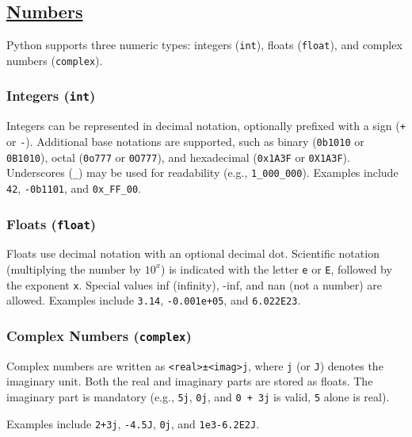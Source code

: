 \subsection*{\href{https://sourceacademy.org/sicpjs/1.1.1\#p3}{Numbers}}

Python supports three numeric types: integers (\texttt{int}), floats (\texttt{float}), and complex numbers (\texttt{complex}).

\subsubsection*{Integers (\texttt{int})}

Integers can be represented in decimal notation, optionally prefixed with a sign (\texttt{+} or \texttt{-}).
Additional base notations are supported, such as binary (\texttt{0b1010} or \texttt{0B1010}), octal (\texttt{0o777} or \texttt{0O777}), and 
hexadecimal (\texttt{0x1A3F} or \texttt{0X1A3F}). 
Underscores (\verb|_|) may be used for readability (e.g., \verb|1_000_000|).
Examples include \texttt{42}, \texttt{-0b1101}, and \verb|0x_FF_00|.

\subsubsection*{Floats (\texttt{float})}
Floats use decimal notation with an optional decimal dot. Scientific notation (multiplying the number by 
$10^x$) is indicated with the letter \texttt{e} or \texttt{E}, followed by the exponent 
\texttt{x}. 
Special values inf (infinity), -inf, and nan (not a number) are allowed.
Examples include \texttt{3.14}, \texttt{-0.001e+05}, and \texttt{6.022E23}.

\subsubsection*{Complex Numbers (\texttt{complex})}
Complex numbers are written as \texttt{<real>±<imag>j}, where \texttt{j} (or \texttt{J}) denotes the imaginary unit. 
Both the real and imaginary parts are stored as floats. The imaginary part is mandatory 
(e.g., \texttt{5j}, \texttt{0j}, and \texttt{0 + 3j} is valid, \texttt{5} alone is real).

Examples include \texttt{2+3j}, \texttt{-4.5J}, \texttt{0j}, and \texttt{1e3-6.2E2J}.